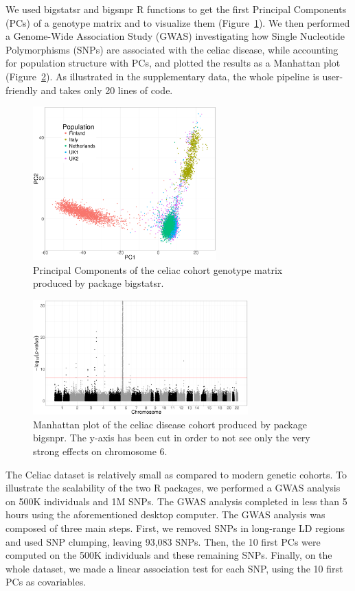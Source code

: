 \documentclass{bioinfo}
\begin{document}
We used bigstatsr and bigsnpr R functions to get the first Principal Components (PCs) of a genotype matrix and to visualize them (Figure~\ref{fig:pca}). We then performed a Genome-Wide Association Study (GWAS) investigating how Single Nucleotide Polymorphisms (SNPs) are associated with the celiac disease, while accounting for population structure with PCs, and plotted the results as a Manhattan plot (Figure~\ref{fig:gwas}). As illustrated in the supplementary data, the whole pipeline is user-friendly and takes only 20 lines of code.


\begin{figure}[!tpb]
\centerline{\includegraphics[width=200pt]{celiac-pca}}
\caption{Principal Components of the celiac cohort genotype matrix produced by package bigstatsr.}\label{fig:pca}
\end{figure}

\begin{figure}[!tpb]
\centerline{\includegraphics[width=235pt]{celiac-gwas-cut}}
\caption{Manhattan plot of the celiac disease cohort produced by package bigsnpr. The y-axis has been cut in order to not see only the very strong effects on chromosome 6.}\label{fig:gwas}
\end{figure}

The Celiac dataset is relatively small as compared to modern genetic cohorts. To illustrate the scalability of the two R packages, we performed a GWAS analysis on 500K individuals and 1M SNPs. The GWAS analysis completed in less than 5 hours using the aforementioned desktop computer. The GWAS analysis was composed of three main steps. First, we removed SNPs in long-range LD regions and used SNP clumping, leaving 93,083 SNPs. Then, the 10 first PCs were computed on the 500K individuals and these remaining SNPs. Finally, on the whole dataset, we made a linear association test for each SNP, using the 10 first PCs as covariables.
\end{document}
